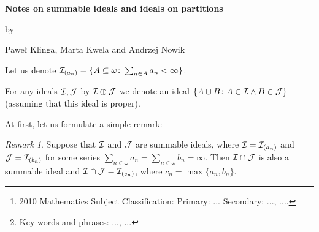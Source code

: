 \documentclass[12pt]{article}
\theoremstyle{plain}
\theoremstyle{definition}
\theoremstyle{remark}
\newtheorem*{remark}{Remark}
\newcommand{\cI}{{\cal I}}
\newcommand{\cJ}{{\cal J}}
\begin{document}
\begin{center}{\bf \Large
		Notes on summable ideals and ideals on partitions
	}
\end{center}
\smallskip
\begin{center}
	by
\end{center}
\smallskip
\begin{center} Pawe\l{} Klinga, Marta Kwela and Andrzej Nowik
\end{center}

\begin{abstract}
	We consider ...
	\let\thefootnote\relax\footnote{2010 Mathematics Subject Classification:  Primary: ... Secondary: ..., ....
	}
	\let\thefootnote\relax\footnote{Key words and phrases: ..., ...}
\end{abstract}

Let us denote
  $\cI_{(a_n)} = \{ A \subseteq \omega\colon \sum_{n\in A} a_n < \infty\}$.
	
	
For any ideals $\cI, \cJ$ by $\cI \oplus \cJ$ we denote
an ideal $\{A \cup B\colon A \in \cI \wedge B \in \cJ\}$ 
(assuming that this ideal is proper).

At first, let us formulate a simple remark:
\begin{remark}
Suppose that $\cI$ and $\cJ$ are summable ideals, where
$\cI = \cI_{(a_n)}$ and $\cJ = \cI_{(b_n)}$ for some
series $\sum_{n\in\omega} a_n = \sum_{n\in\omega} b_n = \infty$.
Then $\cI \cap \cJ$ is also a summable ideal and
$\cI \cap \cJ = \cI_{(c_n)}$, where $c_n= \max\{a_n, b_n\}$.
\end{remark}
\end{document}

